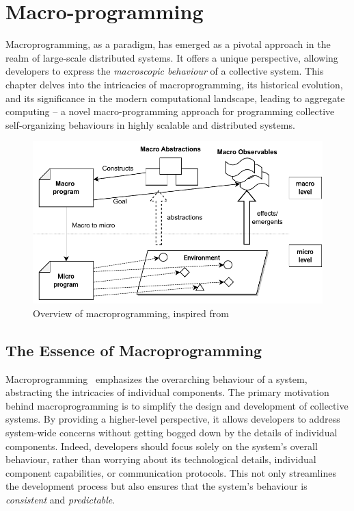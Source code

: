 
\chapter{Macro-programming}\label{chap:macro-programming}%
\minitoc%
\newcommand{\q}[1]{\texttt{#1}}
Macroprogramming, as a paradigm, 
 has emerged as a pivotal approach in the realm of large-scale distributed systems. 
%
It offers a unique perspective, 
 allowing developers to express the \emph{macroscopic behaviour} of a collective system.
% 
This chapter delves into the intricacies of macroprogramming, 
 its historical evolution, and its significance in the modern computational landscape, 
 leading to aggregate computing -- a novel macro-programming approach for 
 programming collective self-organizing behaviours in highly scalable and distributed systems.

\begin{figure}
\includegraphics[width=\textwidth]{chapters/img/macroprogramming.drawio}
\caption[Overview of macroprogramming]{Overview of macroprogramming, inspired from~\cite{casadei2023macroprogramming}}\label{macro:fig:macro-programming}
\end{figure}
\section{The Essence of Macroprogramming}
Macroprogramming~\cite{casadei2023macroprogramming} emphasizes the overarching behaviour of a system, 
 abstracting the intricacies of individual components. 
%
The primary motivation behind macroprogramming 
 is to simplify the design and development of collective systems. 
 By providing a higher-level perspective, 
 it allows developers to address system-wide concerns without getting bogged down by the details of individual components. 
 Indeed, developers should focus solely on the system's overall behaviour, 
 rather than worrying about its technological details, 
 individual component capabilities, or communication protocols.
This not only streamlines the development process but also ensures that the system's behaviour is \emph{consistent} and \emph{predictable}.

